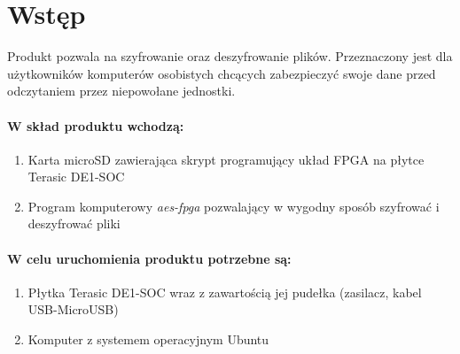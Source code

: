 \section{Wstęp}
Produkt pozwala na szyfrowanie oraz deszyfrowanie plików. Przeznaczony jest dla użytkowników komputerów osobistych chcących zabezpieczyć swoje dane przed odczytaniem przez niepowołane jednostki.

\paragraph{W skład produktu wchodzą:}
\begin{enumerate}
\item Karta microSD zawierająca skrypt programujący układ FPGA na płytce Terasic DE1-SOC
\item Program komputerowy \textit{aes-fpga} pozwalający w wygodny sposób szyfrować i deszyfrować pliki
\end{enumerate}

\paragraph{W celu uruchomienia produktu potrzebne są:}
\begin{enumerate}
\item Płytka Terasic DE1-SOC wraz z zawartością jej pudełka (zasilacz, kabel USB-MicroUSB)
\item Komputer z systemem operacyjnym Ubuntu
\end{enumerate}
